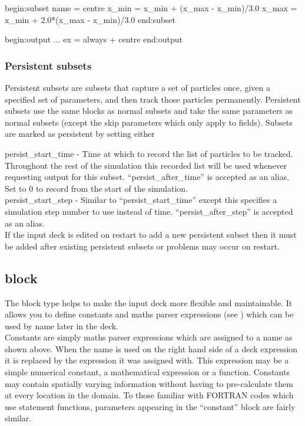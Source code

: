 \begin{boxverbatim}
begin:subset
   name = centre
   x_min = x_min + (x_max - x_min)/3.0
   x_max = x_min + 2.0*(x_max - x_min)/3.0
end:subset

begin:output
   ...
   ex = always + centre
end:output
\end{boxverbatim}

\subsubsection{Persistent subsets}
\label{sec:persistent_subsets}
Persistent subsets are subsets that capture a set of particles once, given a
specified set of parameters, and then track those particles permanently.
Persistent subsets use the same blocks as normal subsets and take the same
parameters as normal subsets (except the skip parameters which only apply to
fields). Subsets are marked as persistent by setting either

{\emphtext persist\_start\_time} - Time at which to record the list of
  particles to be tracked. Throughout the rest of the simulation this recorded
  list will be used whenever requesting output for this subset.
  ``persist\_after\_time'' is accepted as an alias. Set to 0 to record from the
  start of the simulation.\\

{\emphtext persist\_start\_step} - Similar to ``persist\_start\_time'' except
  this specifies a simulation step number to use instead of time.
  ``persist\_after\_step'' is accepted as an alias.\\

If the input deck is edited on restart to add a new persistent subset then it
must be added after existing persistent subsets or problems may occur on
restart.


\subsection{\texorpdfstring
  { block}
  {           {constant} block}}
\label{sec:constant_block}

The  block type helps to make the input deck more flexible
and maintainable. It allows you to define constants and maths parser
expressions (see ) which can be used by name later in the
deck.\\

Constants are simply maths parser expressions which are assigned to a name as
shown above. When the name is used on the right hand side of a deck expression
it is replaced by the expression it was assigned with. This expression may
be a simple numerical constant, a mathematical expression or a function.
Constants may contain spatially varying information without having to
pre-calculate them at every location in the domain.
To those familiar with FORTRAN codes which use statement functions, parameters
appearing in the ``constant'' block are fairly similar.\\

